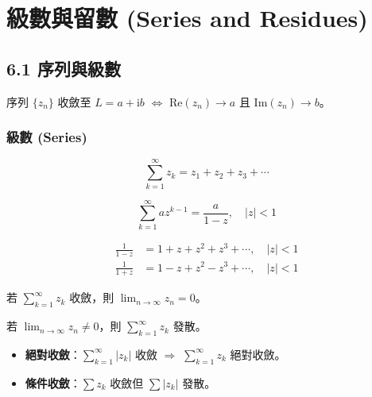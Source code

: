 \documentclass[12pt,a4paper]{article}
\newcommand{\ii}{\mathrm{i}}
\begin{document}
\newpage
\section{級數與留數 (Series and Residues)}

\subsection{6.1 序列與級數}

\begin{defbox}[序列收斂]
序列 $\{z_n\}$ 收斂至 $L=a+\ii b$ $\iff$ $\text{Re}(z_n)\to a$ 且 $\text{Im}(z_n)\to b$。
\end{defbox}

\subsubsection*{級數 (Series)}
$$\sum_{k=1}^{\infty}z_k = z_1+z_2+z_3+\cdots$$

\begin{theorembox}[幾何級數]
$$\sum_{k=1}^{\infty}az^{k-1}=\frac{a}{1-z},\quad |z|<1$$
\end{theorembox}

\begin{keybox}[特殊幾何級數（必背！）]
\begin{align}
\frac{1}{1-z}&=1+z+z^2+z^3+\cdots, \quad |z|<1 \\[4pt]
\frac{1}{1+z}&=1-z+z^2-z^3+\cdots, \quad |z|<1
\end{align}
\end{keybox}

\begin{theorembox}
若 $\displaystyle\sum_{k=1}^{\infty}z_k$ 收斂，則 $\displaystyle\lim_{n\to\infty}z_n=0$。
\end{theorembox}

\begin{theorembox}
若 $\displaystyle\lim_{n\to\infty}z_n\ne 0$，則 $\displaystyle\sum_{k=1}^{\infty}z_k$ 發散。
\end{theorembox}

\begin{defbox}[絕對收斂與條件收斂]
\begin{itemize}[nosep]
\item \textbf{絕對收斂}：$\displaystyle\sum_{k=1}^{\infty}|z_k|$ 收斂 $\Rightarrow$ $\displaystyle\sum_{k=1}^{\infty}z_k$ 絕對收斂。
\item \textbf{條件收斂}：$\displaystyle\sum z_k$ 收斂但 $\displaystyle\sum|z_k|$ 發散。
\end{itemize}
\end{defbox}
\end{document}
